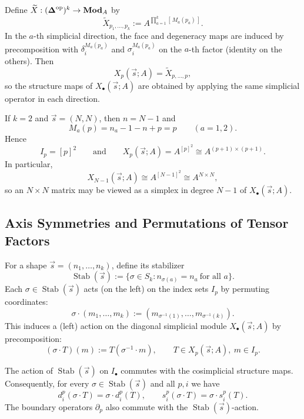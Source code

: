 \begin{remark}\label{rem:kfold}
Define $\widetilde X:(\boldsymbol{\Delta}^{\mathrm{op}})^k\to\mathbf{Mod}_A$ by
\[
\widetilde X_{p_1,\ldots,p_k}:=A^{\prod_{a=1}^k [\,M_a(p_a)\,]}.
\]
In the $a$-th simplicial direction, the face and degeneracy maps are induced by precomposition
with $\delta_i^{M_a(p_a)}$ and $\sigma_i^{M_a(p_a)}$ on the $a$-th factor (identity on the others).
Then
\[
X_p(\vec s;A)=\widetilde X_{p,\ldots,p},
\]
so the structure maps of $X_\bullet(\vec s;A)$ are obtained by applying the same simplicial
operator in each direction.
\end{remark}


\begin{remark}\label{rem:matrices-constant-shape}
If $k=2$ and $\vec s=(N,N)$, then $n=N-1$ and
\[
M_a(p) = n_a-1-n+p = p \qquad (a=1,2).
\]
Hence
\[
I_p = [p]^2
\qquad\text{and}\qquad
X_p(\vec s;A) = A^{[p]^2} \cong A^{(p+1)\times(p+1)}.
\]
In particular,
\[
X_{N-1}(\vec s;A) \cong A^{[N-1]^2} \cong A^{N\times N},
\]
so an $N\times N$ matrix may be viewed as a simplex in degree $N-1$ of $X_\bullet(\vec s;A)$.
\end{remark}


\subsection{Axis Symmetries and Permutations of Tensor Factors}

For a shape $\vec s=(n_1,\dots,n_k)$, define its stabilizer
\[
\operatorname{Stab}(\vec s)
 := \{\sigma\in S_k : n_{\sigma(a)} = n_a\ \text{for all }a\}.
\]
Each $\sigma\in\operatorname{Stab}(\vec s)$ acts (on the left) on the index sets $I_p$ by
permuting coordinates:
\[
\sigma\cdot (m_1,\dots,m_k)
 := (m_{\sigma^{-1}(1)},\dots,m_{\sigma^{-1}(k)}).
\]
This induces a (left) action on the diagonal simplicial module
$X_\bullet(\vec s;A)$ by precomposition:
\[
(\sigma\cdot T)(m) := T(\sigma^{-1}\cdot m),
 \qquad T\in X_p(\vec s;A),\ m\in I_p.
\]

\begin{lemma}\label{lem:equivariance-stab}
The action of $\operatorname{Stab}(\vec s)$ on $I_\bullet$ commutes with the cosimplicial structure maps. Consequently, for every $\sigma\in\operatorname{Stab}(\vec s)$ and all $p,i$ we have
\[
d_i^p(\sigma\cdot T) = \sigma\cdot d_i^p(T),
 \qquad
s_i^p(\sigma\cdot T) = \sigma\cdot s_i^p(T).
\]
The boundary operators $\partial_p$ also commute with the $\operatorname{Stab}(\vec s)$-action.
\end{lemma}

